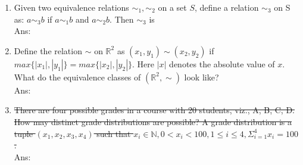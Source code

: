 \documentclass[10pt, letterpaper]{article}
\newcommand{\eat}[1]{}
\begin{document}
\begin{enumerate}\item Given two equivalence relations $\sim_1, \sim_2$ on a set $S$, define a relation $\sim_3$ on S as: $a \sim_3 b$ if $a \sim_1 b$ and $a \sim_2 b$. Then $\sim_3$ is\\
Ans:



\item Define the relation $\sim$ on $\mathbb{R}^2$ as $(x_1, y_1) \sim (x_2, y_2)$ if $max\{|x_1|, |y_1|\} = max\{|x_2|,  |y_2|\}$. Here $|x|$ denotes the absolute value of $x$. What do the equivalence classes of $(\mathbb{R}^2, \sim)$ look like?\\
Ans:



\item \sout{There are four possible grades in a course with 20 students, viz., A, B, C, D. How may distinct grade distributions are possible? A grade distribution is a tuple $(x_1, x_2, x_3, x_4)$ such that $x_i \in \mathbb{N}, 0 < x_i < 100 , 1 \leq i \leq 4, \Sigma_{i=1}^4 x_i = 100$.} \\
Ans:

\end{enumerate}
\end{document}

